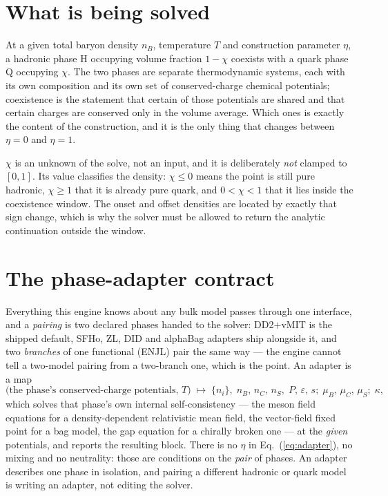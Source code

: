 \documentclass[aps,prc,onecolumn,superscriptaddress,nofootinbib,10pt]{revtex4-2}
\newcommand{\nB}{n_B}
\newcommand{\nC}{n_C}
\newcommand{\nS}{n_S}
\newcommand{\muB}{\mu_B}
\newcommand{\muC}{\mu_C}
\newcommand{\muS}{\mu_S}
\begin{document}
\section{What is being solved}

At a given total baryon density $\nB$, temperature $T$ and construction
parameter $\eta$, a hadronic phase H occupying volume fraction $1-\chi$
coexists with a quark phase Q occupying $\chi$. The two phases are separate
thermodynamic systems, each with its own composition and its own set of
conserved-charge chemical potentials; coexistence is the statement that
certain of those potentials are shared and that certain charges are conserved
only in the volume average. Which ones is exactly the content of the
construction, and it is the only thing that changes between $\eta = 0$ and
$\eta = 1$.

$\chi$ is an unknown of the solve, not an input, and it is deliberately
\emph{not} clamped to $[0,1]$. Its value classifies the density: $\chi \le 0$
means the point is still pure hadronic, $\chi \ge 1$ that it is already pure
quark, and $0 < \chi < 1$ that it lies inside the coexistence window. The
onset and offset densities are located by exactly that sign change, which is
why the solver must be allowed to return the analytic continuation outside
the window.

\section{The phase-adapter contract}
\label{sec:contract}

Everything this engine knows about any bulk model passes through one
interface, and a \emph{pairing} is two declared phases handed to the solver:
DD2$+$vMIT is the shipped default, SFHo, ZL, DID and alphaBag adapters ship
alongside it, and two \emph{branches} of one functional (ENJL) pair the same
way --- the engine cannot tell a two-model pairing from a two-branch one,
which is the point. An adapter is a map
%
\begin{equation}
\big( \text{the phase's conserved-charge potentials},\, T \big)
\;\longmapsto\;
\big\{ n_i \big\},\; \nB,\, \nC,\, \nS,\; P,\, \varepsilon,\, s;\;
\muB,\, \muC,\, \muS;\; \kappa ,
\label{eq:adapter}
\end{equation}
%
which solves that phase's own internal self-consistency --- the meson field
equations for a density-dependent relativistic mean field, the vector-field
fixed point for a bag model, the gap equation for a chirally broken one --- at
the \emph{given} potentials, and reports
the resulting block. There is no $\eta$ in Eq.~(\ref{eq:adapter}), no mixing
and no neutrality: those are conditions on the \emph{pair} of phases. An
adapter describes one phase in isolation, and pairing a different hadronic or
quark model is writing an adapter, not editing the solver.
\end{document}
